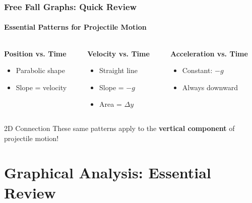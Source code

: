 \documentclass{beamer}
\begin{document}
\begin{frame}
\frametitle{Free Fall Graphs: Quick Review}
\framesubtitle{Essential Patterns for Projectile Motion}
\begin{columns}[T]
    \begin{column}{0.33\textwidth}
        \textbf{Position vs. Time}
        \begin{itemize}
            \item Parabolic shape
            \item Slope = velocity
        \end{itemize}
    \end{column}
    \begin{column}{0.33\textwidth}
        \textbf{Velocity vs. Time}
        \begin{itemize}
            \item Straight line
            \item Slope = $-g$
            \item Area = $\Delta y$
        \end{itemize}
    \end{column}
    \begin{column}{0.33\textwidth}
        \textbf{Acceleration vs. Time}
        \begin{itemize}
            \item Constant: $-g$
            \item Always downward
        \end{itemize}
    \end{column}
\end{columns}
\vspace{1em}
\begin{block}{2D Connection}
These same patterns apply to the \textbf{vertical component} of projectile motion!
\end{block}
\end{frame}

\section{Graphical Analysis: Essential Review}
\end{document}
